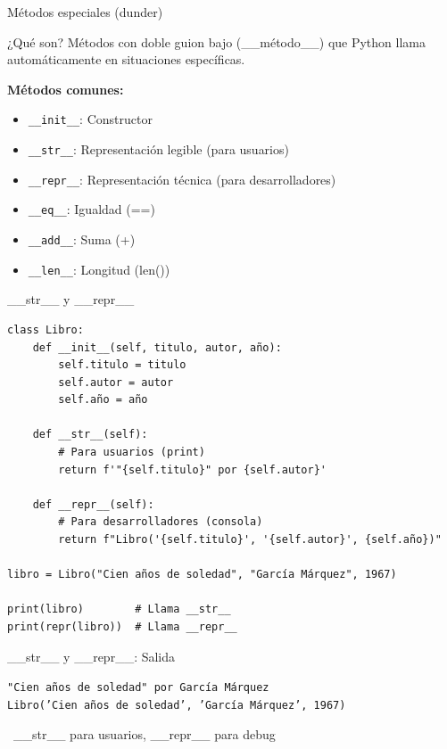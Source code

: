\documentclass{beamer}
\begin{document}
\begin{frame}[fragile]{Métodos especiales (dunder) \faMagic}
\begin{conceptbox}{¿Qué son?}
Métodos con doble guion bajo (\_\_método\_\_) que Python llama automáticamente en situaciones específicas.
\end{conceptbox}

\textbf{Métodos comunes:}
\small
\begin{itemize}
    \item[\faWrench] \texttt{\_\_init\_\_}: Constructor
    \item[\faPrint] \texttt{\_\_str\_\_}: Representación legible (para usuarios)
    \item[\faCode] \texttt{\_\_repr\_\_}: Representación técnica (para desarrolladores)
    \item[\faEquals] \texttt{\_\_eq\_\_}: Igualdad (==)
    \item[\faCalculator] \texttt{\_\_add\_\_}: Suma (+)
    \item[\faListOl] \texttt{\_\_len\_\_}: Longitud (len())
\end{itemize}
\end{frame}

\begin{frame}[fragile]{\_\_str\_\_ y \_\_repr\_\_ \faPrint}
\begin{lstlisting}
class Libro:
    def __init__(self, titulo, autor, año):
        self.titulo = titulo
        self.autor = autor
        self.año = año
    
    def __str__(self):
        # Para usuarios (print)
        return f'"{self.titulo}" por {self.autor}'
    
    def __repr__(self):
        # Para desarrolladores (consola)
        return f"Libro('{self.titulo}', '{self.autor}', {self.año})"

libro = Libro("Cien años de soledad", "García Márquez", 1967)

print(libro)        # Llama __str__
print(repr(libro))  # Llama __repr__
\end{lstlisting}
\end{frame}

\begin{frame}[fragile]{\_\_str\_\_ y \_\_repr\_\_: Salida \faArrowCircleRight}
\begin{tcolorbox}[colback=green!10,colframe=green,title={\small\faArrowCircleRight \ Salida},coltitle=fg0,left=3pt,right=3pt,top=3pt,bottom=3pt,boxsep=2pt]
\small\texttt{"Cien años de soledad" por García Márquez\\
Libro('Cien años de soledad', 'García Márquez', 1967)}
\end{tcolorbox}

\vspace{0.3cm}
\begin{notebox}
\small\faLightbulb\ \_\_str\_\_ para usuarios, \_\_repr\_\_ para debug
\end{notebox}
\end{frame}
\end{document}
